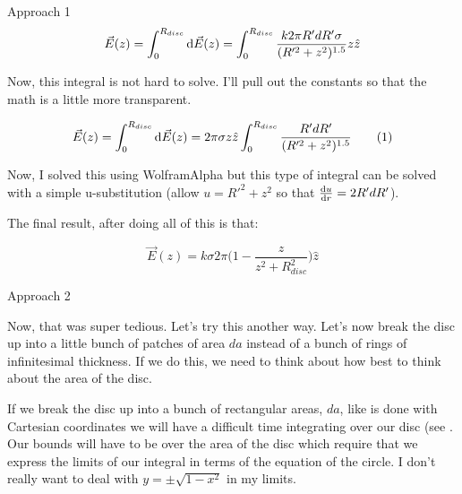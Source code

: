 \begin{homeworkProblem}
\begin{homeworkSection}{Approach 1}
        \[ \vec{E}(z) = \int_0^{R_{disc}} \mathop{}\!\mathrm{d} \vec{E}(z) =
        \int_0^{R_{disc}}\frac{k 2 \pi R' dR' \sigma}{(R'^2+z^2)^{1.5}}
        z\hat{z} \]

        Now, this integral is not hard to solve. I'll pull out the
        constants so that the math is a little more transparent. 
        
        \[ \vec{E}(z) = \int_0^{R_{disc}} \mathop{}\!\mathrm{d} \vec{E}(z) =
        2\pi \sigma z \hat{z} \int_0^{R_{disc}}\frac{R' dR'
        }{(R'^2+z^2)^{1.5}} \tag{1} \]
        
        Now, I solved this using WolframAlpha but this type of integral
        can be solved with a simple u-substitution (allow $u = R'^2 +
        z^2$ so that $\frac{\mathop{}\!\mathrm{d} u}{\mathop{}\!\mathrm{d} r} = 2 R' dR'$).

        The final result, after doing all of this is that:

        \[ \vec{E}(z) = k\sigma 2\pi \bigg( 1 - \frac{z}{z^2+R_{disc}^2}
        \bigg)\hat{z} \]



        
        \end{homeworkSection}
    
    \begin{homeworkSection}{Approach 2}

        Now, that was super tedious. Let's try this another way. Let's
        now break the disc up into a little bunch of patches of area
        $da$ instead of a bunch of rings of infinitesimal thickness. If
        we do this, we need to think about how best to think about the
        area of the disc.
        
        If we break the disc up into a bunch of
        rectangular areas, $da$, like is done with Cartesian coordinates
        we will have a difficult time integrating over our disc (see
        . Our bounds will have to be over the area of the disc which
        require that we express the limits of our integral in terms of
        the equation of the circle. I don't really want to deal with $y
        = \pm \sqrt{1-x^2}$ in my limits.



\end{homeworkSection}
\end{homeworkProblem}
